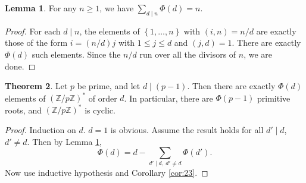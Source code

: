 \documentclass{article}
\newcommand{\Z}{\mathbb{Z}}
\newcommand{\rb}[1]{\left( #1 \right)}
\newcommand{\cb}[1]{\left\{ #1 \right\}}
\theoremstyle{definition}\newtheorem{definition}{Definition}
\theoremstyle{definition}\newtheorem*{remark}{Remark}
\theoremstyle{definition}\newtheorem*{example}{Example}
\theoremstyle{definition}\newtheorem*{note}{Note}
\newtheorem{lemma}[definition]{Lemma}
\newtheorem{theorem}[definition]{Theorem}
\begin{document}
\begin{lemma}
\label{lem:24}
For any $ n \ge 1 $, we have $ \sum_{d \mid n} \Phi\rb{d} = n $.
\end{lemma}

\begin{proof}
For each $ d \mid n $, the elements of $ \cb{1, \dots, n} $ with $ \rb{i, n} = n / d $ are exactly those of the form $ i = \rb{n / d}j $ with $ 1 \le j \le d $ and $ \rb{j, d} = 1 $. There are exactly $ \Phi\rb{d} $ such elements. Since the $ n / d $ run over all the divisors of $ n $, we are done.
\end{proof}

\begin{theorem}
Let $ p $ be prime, and let $ d \mid \rb{p - 1} $. Then there are exactly $ \Phi\rb{d} $ elements of $ \rb{\Z / p\Z}^* $ of order $ d $. In particular, there are $ \Phi\rb{p - 1} $ primitive roots, and $ \rb{\Z / p\Z}^* $ is cyclic.
\end{theorem}

\begin{proof}
Induction on $ d $. $ d = 1 $ is obvious. Assume the result holds for all $ d' \mid d $, $ d' \ne d $. Then by Lemma \ref{lem:24},
$$ \Phi\rb{d} = d - \sum_{d' \mid d, \ d' \ne d} \Phi\rb{d'}. $$
Now use inductive hypothesis and Corollary \ref{cor:23}.
\end{proof}
\end{document}
